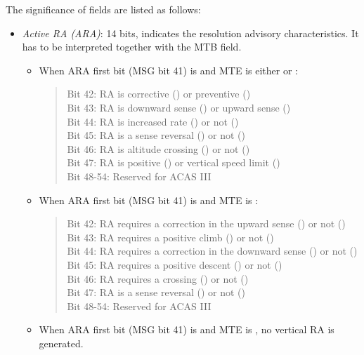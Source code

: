 The significance of fields are listed as follows:

\begin{itemize}
  \item \emph{Active RA (ARA)}: 14 bits, indicates the resolution advisory characteristics. It has to be interpreted together with the MTB field.

    \begin{itemize}
      \item When ARA first bit (MSG bit 41) is \1 and MTE is either \0 or \1:

      \begin{quote}
        \small
        Bit 42: RA is corrective (\1) or preventive (\0) \\
        Bit 43: RA is downward sense (\1) or upward sense (\0) \\
        Bit 44: RA is increased rate (\1) or not (\0) \\
        Bit 45: RA is a sense reversal (\1) or not (\0) \\
        Bit 46: RA is altitude crossing (\1) or not (\0) \\
        Bit 47: RA is positive (\1) or vertical speed limit (\0) \\
        Bit 48-54: Reserved for ACAS III
      \end{quote}

      \item When ARA first bit (MSG bit 41) is \0 and MTE is \1:

      \begin{quote}
        \small
        Bit 42: RA requires a correction in the upward sense (\1) or not (\0) \\
        Bit 43: RA requires a positive climb (\1) or not (\0) \\
        Bit 44: RA requires a correction in the downward sense (\1) or not (\0) \\
        Bit 45: RA requires a positive descent (\1) or not (\0) \\
        Bit 46: RA requires a crossing (\1) or not (\0) \\
        Bit 47: RA is a sense reversal (\1) or not (\0) \\
        Bit 48-54: Reserved for ACAS III
      \end{quote}

      \item When ARA first bit (MSG bit 41) is \0 and MTE is \0, no vertical RA is generated.
    \end{itemize}



\end{itemize}
